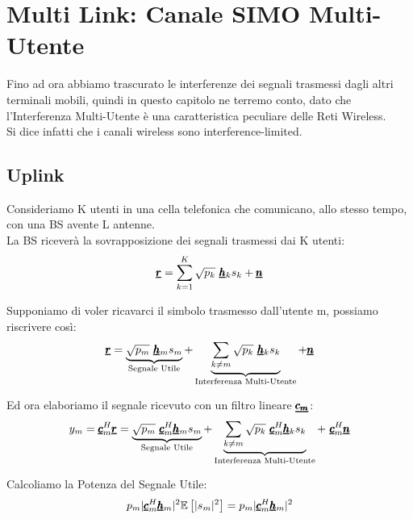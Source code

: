\chapter{Multi Link: Canale SIMO Multi-Utente}
Fino ad ora abbiamo trascurato le interferenze dei segnali trasmessi dagli altri terminali mobili, quindi in questo capitolo ne terremo conto, dato che l'Interferenza Multi-Utente è una caratteristica peculiare delle Reti Wireless.\\

Si dice infatti che i canali wireless sono interference-limited.

\section{Uplink}
Consideriamo K utenti in una cella telefonica che comunicano, allo stesso tempo, con una BS avente L antenne.\\

La BS riceverà la sovrapposizione dei segnali trasmessi dai K utenti:
\begin{equation*}
    \vc{r} = \sum_{k=1}^{K} \sqrt{p_k} \ \vc{h}_k s_k + \vc{n}
\end{equation*}

Supponiamo di voler ricavarci il simbolo trasmesso dall'utente m, possiamo riscrivere così:
\begin{equation*}
    \pmb{\underline{r}} = \underbrace{\sqrt{p_m} \ \pmb{\underline{h}}_m s_m}_{\text{Segnale Utile}}  + \underbrace{\sum_{k \neq m} \sqrt{p_k} \ \pmb{\underline{h}}_k s_k}_{\text{Interferenza Multi-Utente}} + \pmb{\underline{n}}
\end{equation*}

Ed ora elaboriamo il segnale ricevuto con un filtro lineare $\pmb{\underline{c_m}}$:
\begin{equation*}
    y_m = \vc{c}^H_m \vc{r} = \underbrace{\sqrt{p_m} \ \vc{c}^H_m \vc{h}_m s_m}_{\text{Segnale Utile}} + \underbrace{\sum_{k \neq m} \sqrt{p_k} \ \vc{c}^H_m \vc{h}_k s_k}_{\text{Interferenza Multi-Utente}} + \ \vc{c}^H_m \vc{n}
\end{equation*}

Calcoliamo la Potenza del Segnale Utile:
\begin{equation*}
    p_m |\pmb{\underline{c}}^H_m \pmb{\underline{h}}_m|^2 \mathbb{E}\left[|s_m|^2\right] = p_m |\pmb{\underline{c}}^H_m \pmb{\underline{h}}_m|^2
\end{equation*}

